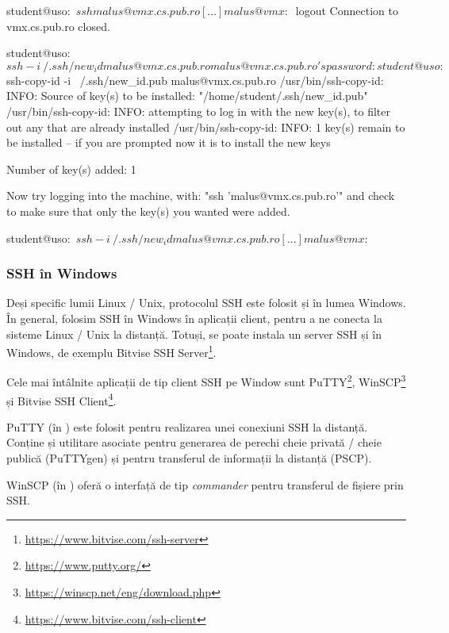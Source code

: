 \begin{screen}[caption={Autentificarea SSH cu cheie publică},label={lst:sec:ssh-pub-auth}]
student@uso:~$ ssh malus@vmx.cs.pub.ro
[...]
malus@vmx:~$ logout
Connection to vmx.cs.pub.ro closed.

student@uso:~$ ssh -i ~/.ssh/new_id malus@vmx.cs.pub.ro
malus@vmx.cs.pub.ro's password:

student@uso:~$ ssh-copy-id -i ~/.ssh/new_id.pub malus@vmx.cs.pub.ro
/usr/bin/ssh-copy-id: INFO: Source of key(s) to be installed: "/home/student/.ssh/new_id.pub"
/usr/bin/ssh-copy-id: INFO: attempting to log in with the new key(s), to filter out any that are already installed
/usr/bin/ssh-copy-id: INFO: 1 key(s) remain to be installed -- if you are prompted now it is to install the new keys

Number of key(s) added: 1

Now try logging into the machine, with:   "ssh 'malus@vmx.cs.pub.ro'"
and check to make sure that only the key(s) you wanted were added.

student@uso:~$ ssh -i ~/.ssh/new_id malus@vmx.cs.pub.ro
[...]
malus@vmx:~$
\end{screen}

\subsubsection{SSH în Windows}
\label{sec:sec:transfer:ssh:windows}

Deși specific lumii Linux / Unix, protocolul SSH este folosit și în lumea Windows.
În general, folosim SSH în Windows în aplicații client, pentru a ne conecta la sisteme Linux / Unix la distanță.
Totuși, se poate instala un server SSH și în Windows, de exemplu Bitvise SSH Server\footnote{\url{https://www.bitvise.com/ssh-server}}.

Cele mai întâlnite aplicații de tip client SSH pe Window sunt PuTTY\footnote{\url{https://www.putty.org/}}, WinSCP\footnote{\url{https://winscp.net/eng/download.php}} și Bitvise SSH Client\footnote{\url{https://www.bitvise.com/ssh-client}}.

PuTTY (în ) este folosit pentru realizarea unei conexiuni SSH la distanță.
Conține și utilitare asociate pentru generarea de perechi cheie privată / cheie publică (PuTTYgen) și pentru transferul de informații la distanță (PSCP).

WinSCP (în ) oferă o interfață de tip \textit{commander} pentru transferul de fișiere prin SSH.

